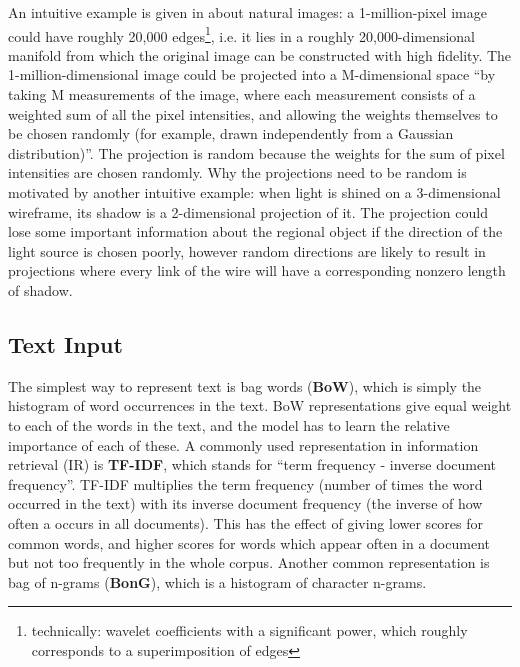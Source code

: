 An intuitive example is given in \cite{compressive_sensing3} about natural images: a 1-million-pixel image could have roughly 20,000 edges\footnote{technically: wavelet coefficients with a significant power, which roughly corresponds to a superimposition of edges}, i.e. it lies in a roughly 20,000-dimensional manifold from which the original image can be constructed with high fidelity.
The 1-million-dimensional image could be projected into a M-dimensional space ``by taking M measurements of the image, where each measurement consists of a weighted sum of all the pixel intensities, and allowing the weights themselves to be chosen randomly (for example, drawn independently from a Gaussian distribution)''\cite{compressive_sensing3}.
The projection is random because the weights for the sum of pixel intensities are chosen randomly.
Why the projections need to be random is motivated by another intuitive example:  when light is shined on a 3-dimensional wireframe, its shadow is a 2-dimensional projection of it.
The projection could lose some important information about the regional object if the direction of the light source is chosen poorly,  however random directions are likely to result in projections where every link of the wire will have a corresponding nonzero length of shadow.

\subsection{Text Input}

The simplest way to represent  text is bag words (\textbf{BoW}),  which  is simply the histogram of word occurrences  in the text.
BoW  representations give equal weight to each of the words in the text, and the model has to learn the relative importance of each of these.
A commonly used representation in information retrieval (IR) is \textbf{TF-IDF},  which stands for ``term frequency -  inverse document frequency''.
TF-IDF  multiplies the term frequency (number of times the word occurred in the text) with its inverse document frequency (the inverse of how often a occurs in all documents).
This has the effect of giving lower scores for common words, and higher scores for words which appear often in a document but not too frequently in the whole corpus.
Another common representation is bag of n-grams (\textbf{BonG}), which  is a histogram of character n-grams.

